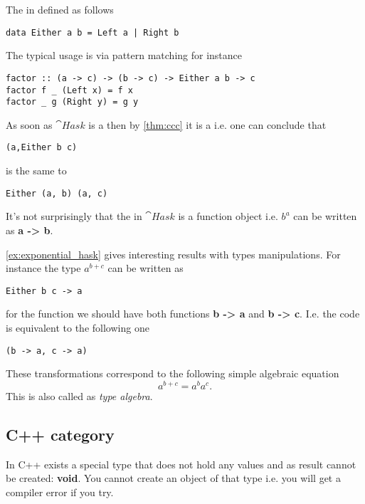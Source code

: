 \begin{example}
\label{ex:hask_sum}
The  in  defined as
follows 
\begin{verbatim}
data Either a b = Left a | Right b
\end{verbatim}

The typical usage is via pattern matching for instance 
\begin{verbatim}
factor :: (a -> c) -> (b -> c) -> Either a b -> c
factor f _ (Left x) = f x
factor _ g (Right y) = g y
\end{verbatim}
\end{example}

\begin{example}
As soon as $\cat{Hask}$ is a 
then by \cref{thm:ccc} it is a 
i.e. one can conclude that
\begin{verbatim}
(a,Either b c)
\end{verbatim}
is the same to
\begin{verbatim}
Either (a, b) (a, c)
\end{verbatim}
\end{example}

\begin{example}
\label{ex:exponential_hask}
It's not surprisingly that the  in
$\cat{Hask}$ is a function object i.e. $b^a$ can be written as  
\textbf{a -> b}.
\end{example}

\begin{example}
\cref{ex:exponential_hask} gives interesting results with types
manipulations. For instance the type $a^{b+c}$ can be written as
\begin{verbatim}
Either b c -> a
\end{verbatim}
for the function we should have both functions 
\textbf{b -> a} and \textbf{b -> c}. I.e.
the code is equivalent to the following one
\begin{verbatim}
(b -> a, c -> a)
\end{verbatim}
These transformations correspond to the following simple algebraic
equation 
\[
a^{b+c} = a^b a^c.
\]
This is also called as \textit{type algebra}.
\end{example}

\subsection{\textbf{C++} category}
\begin{example}
\label{ex:cpp_initial_object}
In C++ exists a special type that does not hold any values and as
result cannot be created: \textbf{void}.
You cannot create an object of that type i.e. you will get a compiler
error if you try.
\end{example}


